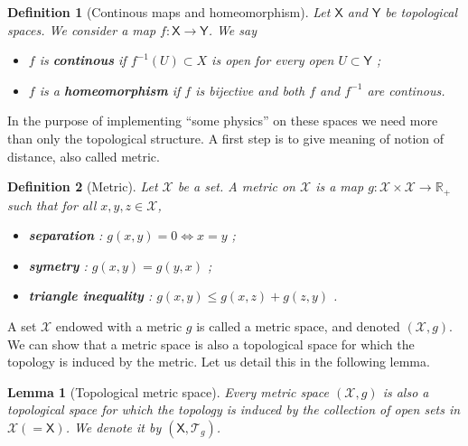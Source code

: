 \documentclass[10pt]{book}
\newcommand{\Tcal}{\mathcal{T}}
\newcommand{\Xcal}{\mathcal{X}}
\newcommand{\Rbb}{\mathbb{R}}
\newcommand{\Xsf}{\mathsf{X}}
\newcommand{\Ysf}{\mathsf{Y}}
\theoremstyle{break}
\newtheorem{lemma}{Lemma}
\newtheorem{definition}{Definition}
\begin{document}
\begin{definition}[Continous maps and homeomorphism]
Let $\Xsf$ and $\Ysf$ be topological spaces. We consider a map $f : \Xsf \to \Ysf$. We say
%
\begin{itemize}
\item $f$ is \textbf{continous} if $f^{-1}(U) \subset X$ is open for every open $U \subset\Ysf$ ;
\item $f$ is a \textbf{homeomorphism} if $f$ is bijective and both $f$ and $f^{-1}$ are continous.
\end{itemize}
%
\end{definition}


In the purpose of implementing ``some physics'' on these spaces we need more than only the topological structure. A first step is to give meaning of notion of distance, also called metric.


\begin{definition}[Metric]
Let $\Xcal$ be a set. A metric on $\Xcal$ is a map $g : \Xcal \times \Xcal \to \Rbb_+$ such that for all $x, y, z \in \Xcal$,%
%
\begin{itemize}
\item \textbf{separation} : $g(x,y) = 0 \Leftrightarrow x=y$ ; 
\item \textbf{symetry} : $g(x,y) = g(y,x)$ ;
\item \textbf{triangle inequality} : $g(x,y) \leq g(x,z) + g(z,y)$ .
\end{itemize}
%
\end{definition}


A set $\Xcal$ endowed with a metric $g$ is called a metric space, and denoted $(\Xcal,g)$. We can show that a metric space is also a topological space for which the topology is induced by the metric. Let us detail this in the following lemma.


\begin{lemma}[Topological metric space]
Every metric space $(\Xcal,g)$ is also a topological space for which the topology is induced by the collection of open sets in $\Xcal(=\Xsf)$. We denote it by $(\Xsf,\Tcal_g)$.
\end{lemma}
\end{document}
